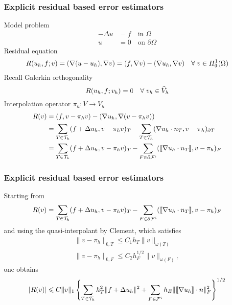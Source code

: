 \begin{frame}
  \frametitle{Explicit residual based error estimators}
  Model problem
  \begin{align*}
    -\Delta u &= f \quad \text{in } \Omega
    \\
    u &= 0  \quad \text{on } \partial \Omega
  \end{align*}
  Residual equation
  \begin{align*}
    R(u_h, f; v) = (\nabla (u - u_h), \nabla v) = (f, \nabla v) - (\nabla u_h,
    \nabla v)\quad \forall \; v \in H^1_0(\Omega)
  \end{align*}
  Recall Galerkin orthogonality
  \[
    R(u_h, f; v_h) = 0 \quad \forall \; v_h \in \widehat{V}_h
  \]
  Interpolation operator $\pi_h: V \to V_h$
  \begin{align*}
    R(v) &= (f ,v - \pi_h v) - (\nabla u_h, \nabla(v - \pi_h v)) \\
         &= \sum_{T \in \mathcal{T}_h} (f + \Delta u_h, v - \pi_h v)_T
    - \sum_{T \in \mathcal{T}_h} (\nabla u_h \cdot n_T, v -
    \pi_h)_{\partial T}
    \\
         &= \sum_{T \in \mathcal{T}_h} (f + \Delta u_h, v - \pi_h v)_T
    - \sum_{F \in \partial \mathcal{F}^i} (\llbracket \nabla u_h \cdot
    n_T \rrbracket, v - \pi_h)_{F}
  \end{align*}
\end{frame}
\begin{frame}
  \frametitle{Explicit residual based error estimators}
  Starting from
  \begin{equation*}
    R(v) = \sum_{T \in \mathcal{T}_h} (f + \Delta u_h, v - \pi_h v)_T
    - \sum_{F \in \partial \mathcal{F}^i} (\llbracket \nabla u_h \cdot
    n_T \rrbracket, v - \pi_h)_{F}
  \end{equation*}
  and using the quasi-interpolant by Clement, which satisfies
  \begin{align*}
    \| v - \pi_h \|_{0,T} \le C_1  h_T \| v \|_{\omega(T)} \\
    \| v - \pi_h \|_{0,F} \le C_2  h_F^{1/2} \| v \|_{\omega(F)},
  \end{align*}
  one obtains
  \begin{align*}
    |R(v)| \leqslant C \| v \|_1
  \left
\{
  \sum_{T \in \mathcal{T}_h} h_T^2 \|f + \Delta u_h \|^2 +
  \sum_{F \in \mathcal{F}^i} h_E \| \llbracket \nabla u_h \rrbracket \cdot n \|_F^2
  \right
\}^{1/2}
  \end{align*}
\end{frame}

